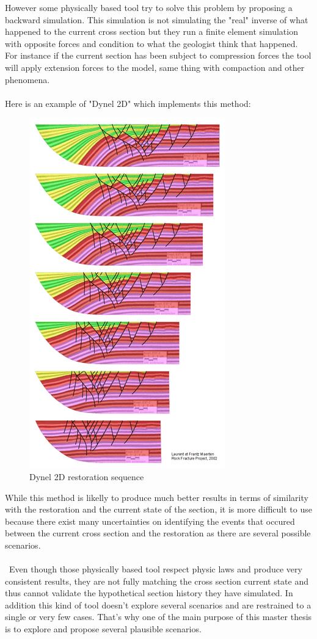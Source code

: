 \documentclass[12pt, a4paper]{memoir} %
\begin{document}
 However some physically based tool try to  solve this problem by proposing a backward simulation. This simulation is not simulating the "real" inverse of what happened to the current cross section but they run a finite element simulation with opposite forces and condition to what the geologist think that happened. For instance if the current section has been subject to compression forces the tool will apply extension forces to the model, same thing with compaction and other phenomena.\\\\
 Here is an example of "Dynel 2D" \cite{Dynel} which implements this method:
 \begin{figure}[H]
	\centering
	\includegraphics[scale=0.5]{dynel2D.png}
	\caption{Dynel 2D restoration sequence}
\end{figure}
 
 While this method is likelly to produce much better results in terms of similarity with the restoration and the current state of the section, it is more difficult to use because there exist many uncertainties on identifying the events that occured between the current cross section and the restoration as there are several possible scenarios. \\\\\
Even though those physically based tool respect physic laws and produce very consistent results, they are not fully matching the cross section current state and thus cannot validate the hypothetical section history they have simulated. In addition this kind of tool doesn't explore several scenarios and are restrained to a single or very few cases. 
That's why one of the main purpose of this master thesis is to explore and propose several plausible scenarios.
\end{document}
